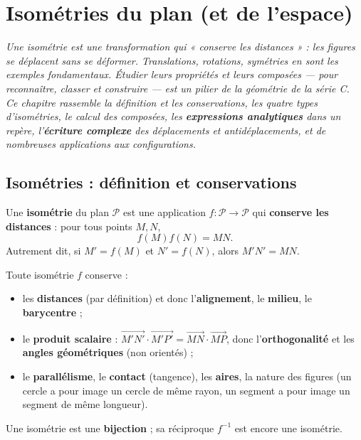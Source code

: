 \chapter{Isométries du plan (et de l'espace)}

\noindent\textit{Une isométrie est une transformation qui « conserve les distances » :
les figures se déplacent sans se déformer. Translations, rotations, symétries en sont les
exemples fondamentaux. Étudier leurs propriétés et leurs composées — pour reconnaître,
classer et construire — est un pilier de la géométrie de la série C. Ce chapitre rassemble
la définition et les conservations, les quatre types d'isométries, le calcul des composées,
les \textbf{expressions analytiques} dans un repère, l'\textbf{écriture complexe} des
déplacements et antidéplacements, et de nombreuses applications aux configurations.}
\vspace{8pt}

\section{Isométries : définition et conservations}

\begin{definition}
Une \textbf{isométrie} du plan $\mathcal P$ est une application $f:\mathcal P\to\mathcal P$ qui \textbf{conserve les distances} : pour tous points $M,N$,
\[
f(M)f(N)=MN.
\]
Autrement dit, si $M'=f(M)$ et $N'=f(N)$, alors $M'N'=MN$.
\end{definition}

\begin{propriete}
Toute isométrie $f$ conserve :
\begin{itemize}
\item les \textbf{distances} (par définition) et donc l'\textbf{alignement}, le \textbf{milieu}, le \textbf{barycentre} ;
\item le \textbf{produit scalaire} : $\overrightarrow{M'N'}\cdot\overrightarrow{M'P'}=\overrightarrow{MN}\cdot\overrightarrow{MP}$, donc l'\textbf{orthogonalité} et les \textbf{angles géométriques} (non orientés) ;
\item le \textbf{parallélisme}, le \textbf{contact} (tangence), les \textbf{aires}, la nature des figures (un cercle a pour image un cercle de même rayon, un segment a pour image un segment de même longueur).
\end{itemize}
Une isométrie est une \textbf{bijection} ; sa réciproque $f^{-1}$ est encore une isométrie.
\end{propriete}

